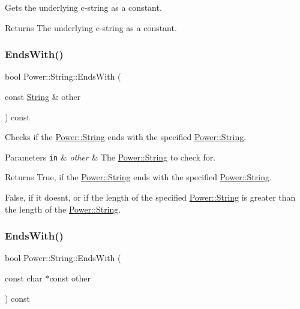 Gets the underlying c-\/string as a constant. 

\begin{DoxyReturn}{Returns}
The underlying c-\/string as a constant. 
\end{DoxyReturn}
\mbox{\label{class_power_1_1_string_ae936d98f4be00ce5b901a561cac63ab0}} 
\subsubsection{\texorpdfstring{Ends\+With()}{EndsWith()}\hspace{0.1cm}{\footnotesize\ttfamily [1/4]}}
{\footnotesize\ttfamily bool Power\+::\+String\+::\+Ends\+With (\begin{DoxyParamCaption}\item[{const \hyperlink{class_power_1_1_string}{String} \&}]{other }\end{DoxyParamCaption}) const\hspace{0.3cm}{\ttfamily [inline]}}



Checks if the \hyperlink{class_power_1_1_string}{Power\+::\+String} ends with the specified \hyperlink{class_power_1_1_string}{Power\+::\+String}. 


\begin{DoxyParams}[1]{Parameters}
\mbox{\tt in}  & {\em other} & The \hyperlink{class_power_1_1_string}{Power\+::\+String} to check for. \\
\hline
\end{DoxyParams}
\begin{DoxyReturn}{Returns}
True, if the \hyperlink{class_power_1_1_string}{Power\+::\+String} ends with the specified \hyperlink{class_power_1_1_string}{Power\+::\+String}. 

False, if it doesn\textquotesingle{}t, or if the length of the specified \hyperlink{class_power_1_1_string}{Power\+::\+String} is greater than the length of the \hyperlink{class_power_1_1_string}{Power\+::\+String}. 
\end{DoxyReturn}
\mbox{\label{class_power_1_1_string_a007514d96b8e99416e0c10f6b72675c5}} 
\subsubsection{\texorpdfstring{Ends\+With()}{EndsWith()}\hspace{0.1cm}{\footnotesize\ttfamily [2/4]}}
{\footnotesize\ttfamily bool Power\+::\+String\+::\+Ends\+With (\begin{DoxyParamCaption}\item[{const char $\ast$const}]{other }\end{DoxyParamCaption}) const\hspace{0.3cm}{\ttfamily [inline]}}



